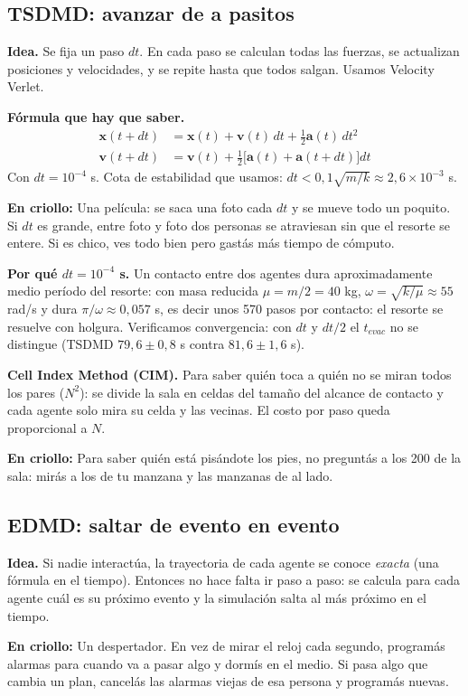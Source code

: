\documentclass[10.5pt,a4paper]{article}
\newcommand{\vect}[1]{\mathbf{#1}}
\newcommand{\analogia}[1]{\par\colorbox{ana}{\parbox{\dimexpr\linewidth-2\fboxsep}{\textbf{En criollo:} #1}}\par}
\newcommand{\formula}[1]{\par\colorbox{fml}{\parbox{\dimexpr\linewidth-2\fboxsep}{\textbf{Fórmula que hay que saber.} #1}}\par}
\begin{document}
\subsection{TSDMD: avanzar de a pasitos}
\textbf{Idea.} Se fija un paso $dt$. En cada paso se calculan todas las fuerzas, se actualizan posiciones y velocidades, y se repite hasta que todos salgan. Usamos Velocity Verlet.
\formula{
\begin{align*}
\vect x(t+dt) &= \vect x(t)+\vect v(t)\,dt+\tfrac12\vect a(t)\,dt^2\\
\vect v(t+dt) &= \vect v(t)+\tfrac12\bigl[\vect a(t)+\vect a(t+dt)\bigr]dt
\end{align*}
Con $dt=10^{-4}$ s. Cota de estabilidad que usamos: $dt<0{,}1\sqrt{m/k}\approx2{,}6\times10^{-3}$ s.}
\analogia{Una película: se saca una foto cada $dt$ y se mueve todo un poquito. Si $dt$ es grande, entre foto y foto dos personas se atraviesan sin que el resorte se entere. Si es chico, ves todo bien pero gastás más tiempo de cómputo.}

\textbf{Por qué $dt=10^{-4}$ s.} Un contacto entre dos agentes dura aproximadamente medio período del resorte: con masa reducida $\mu=m/2=40$ kg, $\omega=\sqrt{k/\mu}\approx55$ rad/s y dura $\pi/\omega\approx0{,}057$ s, es decir unos 570 pasos por contacto: el resorte se resuelve con holgura. Verificamos convergencia: con $dt$ y $dt/2$ el $t_{evac}$ no se distingue (TSDMD $79{,}6\pm0{,}8$ s contra $81{,}6\pm1{,}6$ s).

\textbf{Cell Index Method (CIM).} Para saber quién toca a quién no se miran todos los pares ($N^2$): se divide la sala en celdas del tamaño del alcance de contacto y cada agente solo mira su celda y las vecinas. El costo por paso queda proporcional a $N$.
\analogia{Para saber quién está pisándote los pies, no preguntás a los 200 de la sala: mirás a los de tu manzana y las manzanas de al lado.}

\subsection{EDMD: saltar de evento en evento}
\textbf{Idea.} Si nadie interactúa, la trayectoria de cada agente se conoce \emph{exacta} (una fórmula en el tiempo). Entonces no hace falta ir paso a paso: se calcula para cada agente cuál es su próximo evento y la simulación salta al más próximo en el tiempo.
\analogia{Un despertador. En vez de mirar el reloj cada segundo, programás alarmas para cuando va a pasar algo y dormís en el medio. Si pasa algo que cambia un plan, cancelás las alarmas viejas de esa persona y programás nuevas.}
\end{document}
